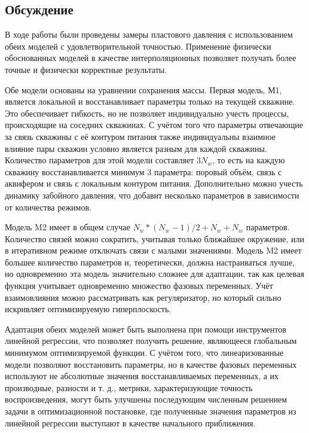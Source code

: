 \documentclass[14pt]{article}
\begin{document}
\subsection{Обсуждение}
В ходе работы были проведены замеры пластового давления с использованием обеих моделей с удовлетворительной точностью. Применение физически обоснованных моделей в качестве интерполяционных позволяет получать более точные и физически корректные результаты.

Обе модели основаны на уравнении сохранения массы. Первая модель, М1, является локальной и восстанавливает параметры только на текущей скважине. Это обеспечивает гибкость, но не позволяет индивидуально учесть процессы, происходящие на соседних скважинах. С учётом того что параметры отвечающие за связь скважины с её контуром питания также индивидуальны взаимное влияние пары скважин условно является разным для каждой скважины. Количество параметров для этой модели составляет $3N_w$, то есть на каждую скважину восстанавливается минимум 3 параметра: поровый объём, связь с аквифером и связь с локальным контуром питания. Дополнительно можно учесть динамику забойного давления, что добавит несколько параметров в зависимости от количества режимов.

Модель M2 имеет в общем случае $N_w*(N_w-1)/2 + N_w + N_w$ параметров. Количество связей можно сократить, учитывая только ближайшее окружение, или в итеративном режиме отключать связи с малыми значениями.
Модель M2 имеет большее количество параметров и, теоретически, должна настраиваться лучше, но одновременно эта модель значительно сложнее для адаптации, так как целевая функция учитывает одновременно множество фазовых переменных.
Учёт взаимовлияния можно рассматривать как регуляризатор, но который сильно искривляет оптимизируемую гиперплоскость.

Адаптация обеих моделей может быть выполнена при помощи инструментов линейной регрессии, что позволяет получить решение, являющееся глобальным минимумом оптимизируемой функции.
С учётом того, что линеаризованные модели позволяют восстановить параметры, но в качестве фазовых переменных используют не абсолютные значения восстанавливаемых переменных, а их производные, разности и т. д., метрики, характеризующие точность воспроизведения, могут быть улучшены последующим численным решением задачи в оптимизационной постановке, где полученные значения параметров из линейной регрессии выступают в качестве начального приближения.
\end{document}
